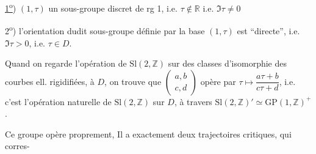 \uline{1\textsuperscript{o}}) $(1,\tau)$  un sous-groupe discret de rg 1, i.e. $\tau\notin\mathbb R$ i.e. $\Im\tau\ne0$

2\textsuperscript{o}) l'orientation dudit sous-groupe définie par la base $(1,\tau)$ est ``directe'', i.e. $\Im\tau>0$, i.e. $\tau\in D$.

Quand on regarde l'opération de $\mathrm{Sl}(2,\mathbb Z)$ sur  des classes d'isomorphie des courbes ell. rigidifiées,   à $D$, on trouve que $\begin{pmatrix}a,b\\c,d\end{pmatrix}$ opère par $\tau\longmapsto\dfrac{a\tau+b}{c\tau+d}$, i.e. c'est l'opération naturelle de $\mathrm{Sl}(2,\mathbb Z)$ sur $D$, à travers $\mathrm{Sl}(2,\mathbb Z)'\simeq\mathrm{GP}(1,\mathbb Z)^+$.

Ce groupe opère proprement, Il a exactement deux trajectoires critiques, qui corres-
